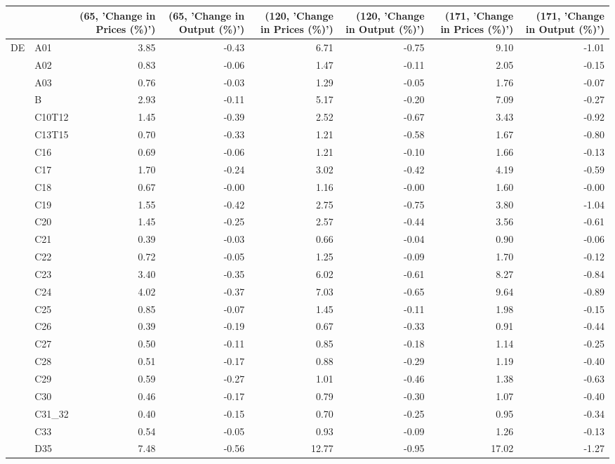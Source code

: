 \begin{tabular}{llrrrrrr}
\toprule
 &  & (65, 'Change in Prices (\%)') & (65, 'Change in Output (\%)') & (120, 'Change in Prices (\%)') & (120, 'Change in Output (\%)') & (171, 'Change in Prices (\%)') & (171, 'Change in Output (\%)') \\
\midrule
\multirow[t]{64}{*}{DE} & A01 & 3.85 & -0.43 & 6.71 & -0.75 & 9.10 & -1.01 \\
 & A02 & 0.83 & -0.06 & 1.47 & -0.11 & 2.05 & -0.15 \\
 & A03 & 0.76 & -0.03 & 1.29 & -0.05 & 1.76 & -0.07 \\
 & B & 2.93 & -0.11 & 5.17 & -0.20 & 7.09 & -0.27 \\
 & C10T12 & 1.45 & -0.39 & 2.52 & -0.67 & 3.43 & -0.92 \\
 & C13T15 & 0.70 & -0.33 & 1.21 & -0.58 & 1.67 & -0.80 \\
 & C16 & 0.69 & -0.06 & 1.21 & -0.10 & 1.66 & -0.13 \\
 & C17 & 1.70 & -0.24 & 3.02 & -0.42 & 4.19 & -0.59 \\
 & C18 & 0.67 & -0.00 & 1.16 & -0.00 & 1.60 & -0.00 \\
 & C19 & 1.55 & -0.42 & 2.75 & -0.75 & 3.80 & -1.04 \\
 & C20 & 1.45 & -0.25 & 2.57 & -0.44 & 3.56 & -0.61 \\
 & C21 & 0.39 & -0.03 & 0.66 & -0.04 & 0.90 & -0.06 \\
 & C22 & 0.72 & -0.05 & 1.25 & -0.09 & 1.70 & -0.12 \\
 & C23 & 3.40 & -0.35 & 6.02 & -0.61 & 8.27 & -0.84 \\
 & C24 & 4.02 & -0.37 & 7.03 & -0.65 & 9.64 & -0.89 \\
 & C25 & 0.85 & -0.07 & 1.45 & -0.11 & 1.98 & -0.15 \\
 & C26 & 0.39 & -0.19 & 0.67 & -0.33 & 0.91 & -0.44 \\
 & C27 & 0.50 & -0.11 & 0.85 & -0.18 & 1.14 & -0.25 \\
 & C28 & 0.51 & -0.17 & 0.88 & -0.29 & 1.19 & -0.40 \\
 & C29 & 0.59 & -0.27 & 1.01 & -0.46 & 1.38 & -0.63 \\
 & C30 & 0.46 & -0.17 & 0.79 & -0.30 & 1.07 & -0.40 \\
 & C31\_32 & 0.40 & -0.15 & 0.70 & -0.25 & 0.95 & -0.34 \\
 & C33 & 0.54 & -0.05 & 0.93 & -0.09 & 1.26 & -0.13 \\
 & D35 & 7.48 & -0.56 & 12.77 & -0.95 & 17.02 & -1.27 \\

\end{tabular}
